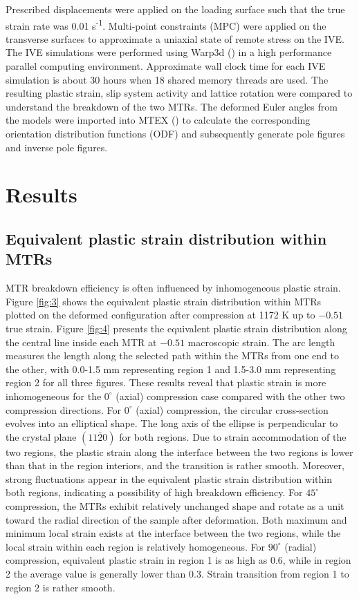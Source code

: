 \documentclass[review]{elsarticle}
\begin{document}
	Prescribed displacements were applied on the loading surface such that the true strain rate was 0.01 s\textsuperscript{-1}.
	Multi-point constraints (MPC) were applied on the transverse surfaces to approximate a uniaxial state of remote stress on the IVE.
	The IVE simulations were performed using Warp3d (\cite{r21}) in a high performance parallel computing environment.
    Approximate wall clock time for each IVE simulation is about 30 hours when 18 shared memory threads are used.
	The resulting plastic strain, slip system activity and lattice rotation were compared to understand the breakdown of the two MTRs.
	The deformed Euler angles from the models were imported into MTEX (\cite{r31}) to calculate the corresponding orientation distribution functions (ODF) and subsequently generate pole figures and inverse pole figures.
\section{Results}
\label{results}
	\subsection{Equivalent plastic strain distribution within MTRs}
	MTR breakdown efficiency is often influenced by inhomogeneous plastic strain.
	Figure \ref{fig:3} shows the equivalent plastic strain distribution within MTRs plotted on the deformed configuration after compression at 1172 K up to $-0.51$ true strain.
	Figure \ref{fig:4} presents the equivalent plastic strain distribution along the central line inside each MTR at $-0.51$ macroscopic strain.
	The arc length measures the length along the selected path within the MTRs from one end to the other, with 0.0-1.5 mm representing region 1 and 1.5-3.0 mm representing region 2 for all three figures.
	These results reveal that plastic strain is more inhomogeneous for the $0^{\circ}$ (axial) compression case compared with the other two compression directions.
	For $0^{\circ}$ (axial) compression, the circular cross-section evolves into an elliptical shape.
	The long axis of the ellipse is perpendicular to the crystal plane $(11\bar{2}0)$ for both regions.
	Due to strain accommodation of the two regions, the plastic strain along the interface between the two regions is lower than that in the region interiors, and the transition is rather smooth.
	Moreover, strong fluctuations appear in the equivalent plastic strain distribution within both regions, indicating a possibility of high breakdown efficiency.
	For $45^{\circ}$ compression, the MTRs exhibit relatively unchanged shape and rotate as a unit toward the radial direction of the sample after deformation.
	Both maximum and minimum local strain exists at the interface between the two regions, while the local strain within each region is relatively homogeneous.
	For $90^{\circ}$ (radial) compression, equivalent plastic strain in region 1 is as high as 0.6, while in region 2 the average value is generally lower than 0.3.
	Strain transition from region 1 to region 2 is rather smooth.
\end{document}
